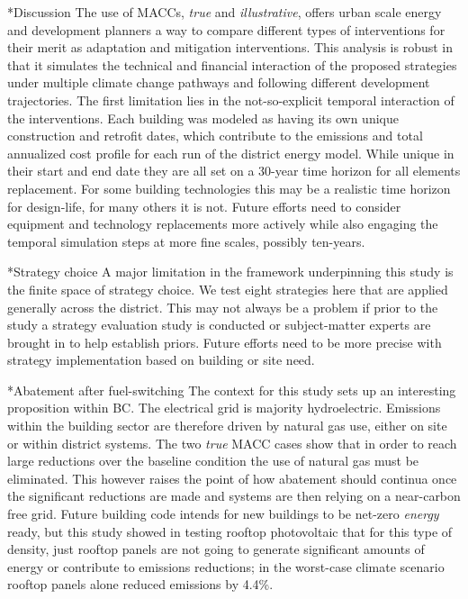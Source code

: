 \documentclass[twocolumn, a4paper,10pt]{article}
\makeatletter
\renewcommand\section{\@startsection{section}{1}{\z@}{3pt}{3pt}{\normalfont\large\bfseries}}
\renewcommand\subsection{\@startsection{subsection}{1}{\z@}{\z@}{\z@}{\normalfont\normalsize\bfseries}}
\renewcommand\subsection{\@startsection{subsection}{1}{\z@}{\z@}{0.1pt}{\normalfont\normalsize\bfseries}}
\makeatother
\begin{document}
\section*{Discussion}
The use of MACCs, \textit{true} and \textit{illustrative}, offers urban scale energy and development planners a way to compare different types of interventions for their merit as adaptation and mitigation interventions. This analysis is robust in that it simulates the technical and financial interaction of the proposed strategies under multiple climate change pathways and following different development trajectories. The first limitation lies in the not-so-explicit temporal interaction of the interventions. Each building was modeled as having its own unique construction and retrofit dates, which contribute to the emissions and total annualized cost profile for each run of the district energy model. While unique in their start and end date they are all set on a 30-year time horizon for all elements replacement. For some building technologies this may be a realistic time horizon for design-life, for many others it is not. Future efforts need to consider equipment and technology replacements more actively while also engaging the temporal simulation steps at more fine scales, possibly ten-years. 


\subsection*{Strategy choice}
A major limitation in the framework underpinning this study is the finite space of strategy choice. We test eight strategies here that are applied generally across the district. This may not always be a problem if prior to the study a strategy evaluation study is conducted or subject-matter experts are brought in to help establish priors. Future efforts need to be more precise with strategy implementation based on building or site need. 

\subsection*{Abatement after fuel-switching}
The context for this study sets up an interesting proposition within BC. The electrical grid is majority hydroelectric. Emissions within the building sector are therefore driven by natural gas use, either on site or within district systems. The two \textit{true} MACC cases show that in order to reach large reductions over the baseline condition the use of natural gas must be eliminated. This however raises the point of how abatement should continua once the significant reductions are made and systems are then relying on a near-carbon free grid. Future building code intends for new buildings to be net-zero \textit{energy} ready, but this study showed in testing rooftop photovoltaic that for this type of density, just rooftop panels are not going to generate significant amounts of energy or contribute to emissions reductions; in the worst-case climate scenario rooftop panels alone reduced emissions by 4.4\%. 
\end{document}
